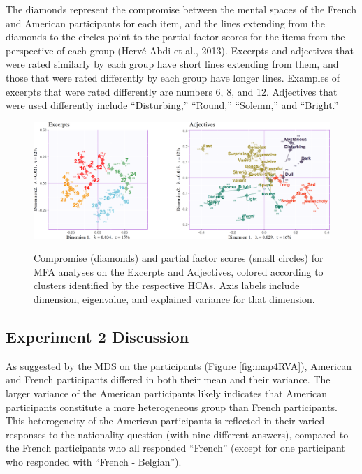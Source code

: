 \documentclass[
  english,
  man]{apa6}
\begin{document}
The diamonds represent the compromise between the mental spaces of the French and American participants for each item, and the lines extending from the diamonds to the circles point to the partial factor scores for the items from the perspective of each group (Hervé Abdi et al., 2013). Excerpts and adjectives that were rated similarly by each group have short lines extending from them, and those that were rated differently by each group have longer lines. Examples of excerpts that were rated differently are numbers 6, 8, and 12. Adjectives that were used differently include ``Disturbing,'' ``Round,'' ``Solemn,'' and ``Bright.''

\begin{figure}   
  \centering  
  \caption{Compromise (diamonds) and partial factor scores (small circles) for MFA analyses on the Excerpts and Adjectives, colored according to clusters identified by the respective HCAs. Axis labels include dimension, eigenvalue, and explained variance for that dimension.}
    \includegraphics{./Music-Descriptor-Space_files/figure-latex/mfatogether-1.png}
  \label{fig:mfasbs}
\end{figure}

\hypertarget{experiment-2-discussion}{%
\subsection{Experiment 2 Discussion}\label{experiment-2-discussion}}

As suggested by the MDS on the participants (Figure \ref{fig:map4RVA}), American and French participants differed in both their mean and their variance. The larger variance of the American participants likely indicates that American participants constitute a more heterogeneous group than French participants. This heterogeneity of the American participants is reflected in their varied responses to the nationality question (with nine different answers), compared to the French participants who all responded ``French'' (except for one participant who responded with ``French - Belgian'').
\end{document}
